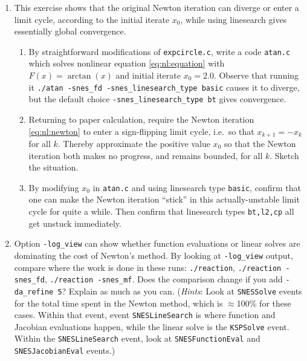 \begin{enumerate}
\item  \label{exer:nl:newtonatan}
This exercise shows that the original Newton iteration can diverge or enter a limit cycle, according to the initial iterate $x_0$, while using linesearch gives essentially global convergence.
    \begin{enumerate}
    \item By straightforward modifications of \texttt{expcircle.c}, write a code \texttt{atan.c} which solves nonlinear equation \eqref{eq:nl:equation} with $F(x)=\arctan(x)$ and initial iterate $x_0=2.0$.  Observe that running it \texttt{./atan -snes\_fd -snes\_linesearch\_type basic} causes it to diverge, but the default choice \texttt{-snes\_linesearch\_type bt} gives convergence.
    \item Returning to paper calculation, require the Newton iteration \eqref{eq:nl:newton} to enter a sign-flipping limit cycle, i.e.~so that $x_{k+1} = - x_k$ for all $k$.  Thereby approximate the positive value $x_0$ so that the Newton iteration both makes no progress, and remains bounded, for all $k$.  Sketch the situation.
    \item By modifying $x_0$ in \texttt{atan.c} and using linesearch type \texttt{basic}, confirm that one can make the Newton iteration ``stick'' in this actually-unstable limit cycle for quite a while.  Then confirm that linesearch types \texttt{bt,l2,cp} all get unstuck immediately.
    \end{enumerate}

\item Option \texttt{-log\_view} can show whether function evaluations or linear solves are dominating the cost of Newton's method.  By looking at \texttt{-log\_view} output, compare where the work is done in these runs: \texttt{./reaction}, \texttt{./reaction -snes\_fd}, \texttt{./reaction -snes\_mf}.  Does the comparison change if you add \texttt{-da\_refine 5}?  Explain as much as you can.  (\emph{Hints}: Look at \texttt{SNESSolve} events for the total time spent in the Newton method, which is $\approx$100\% for these cases.  Within that event, event \texttt{SNESLineSearch} is where function and Jacobian evaluations happen, while the linear solve is the \texttt{KSPSolve} event.  Within the \texttt{SNESLineSearch} event, look at \texttt{SNESFunctionEval} and \texttt{SNESJacobianEval} events.)


\end{enumerate}
